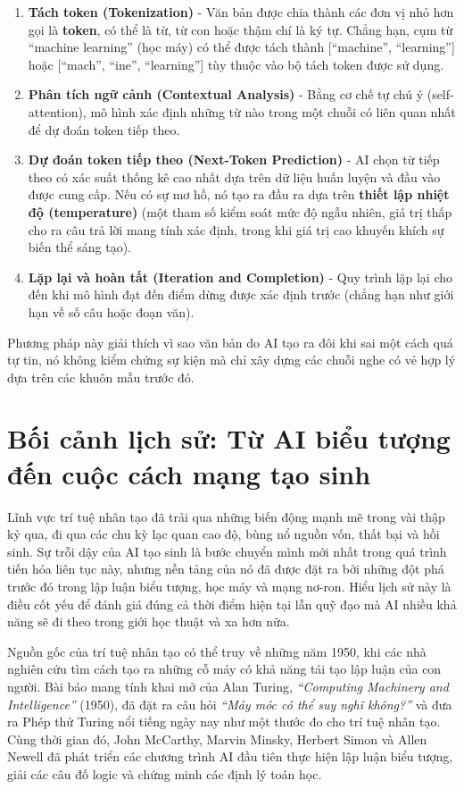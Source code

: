 \begin{enumerate}
\def\labelenumi{\arabic{enumi}.}
\item
  \textbf{Tách token (Tokenization)} - Văn bản được chia thành các đơn vị nhỏ hơn gọi là \textbf{token}, có thể là từ, từ con hoặc thậm chí là ký tự. Chẳng hạn, cụm từ ``machine learning'' (học máy) có thể được tách thành {[}``machine'', ``learning''{]} hoặc {[}``mach'', ``ine'', ``learning''{]} tùy thuộc vào bộ tách token được sử dụng.
\item
  \textbf{Phân tích ngữ cảnh (Contextual Analysis)} - Bằng cơ chế tự chú ý (self-attention), mô hình xác định những từ nào trong một chuỗi có liên quan nhất để dự đoán token tiếp theo.
\item
  \textbf{Dự đoán token tiếp theo (Next-Token Prediction)} - AI chọn từ tiếp theo có xác suất thống kê cao nhất dựa trên dữ liệu huấn luyện và đầu vào được cung cấp. Nếu có sự mơ hồ, nó tạo ra đầu ra dựa trên \textbf{thiết lập nhiệt độ (temperature)} (một tham số kiểm soát mức độ ngẫu nhiên, giá trị thấp cho ra câu trả lời mang tính xác định, trong khi giá trị cao khuyến khích sự biến thể sáng tạo).
\item
  \textbf{Lặp lại và hoàn tất (Iteration and Completion)} - Quy trình lặp lại cho đến khi mô hình đạt đến điểm dừng được xác định trước (chẳng hạn như giới hạn về số câu hoặc đoạn văn).
\end{enumerate}

Phương pháp này giải thích vì sao văn bản do AI tạo ra đôi khi sai một cách quá tự tin, nó không kiểm chứng sự kiện mà chỉ xây dựng các chuỗi nghe có vẻ hợp lý dựa trên các khuôn mẫu trước đó.

\section{Bối cảnh lịch sử: Từ AI biểu tượng đến cuộc cách mạng tạo sinh}

Lĩnh vực trí tuệ nhân tạo đã trải qua những biến động mạnh mẽ trong vài thập kỷ qua, đi qua các chu kỳ lạc quan cao độ, bùng nổ nguồn vốn, thất bại và hồi sinh. Sự trỗi dậy của AI tạo sinh là bước chuyển mình mới nhất trong quá trình tiến hóa liên tục này, nhưng nền tảng của nó đã được đặt ra bởi những đột phá trước đó trong lập luận biểu tượng, học máy và mạng nơ-ron. Hiểu lịch sử này là điều cốt yếu để đánh giá đúng cả thời điểm hiện tại lẫn quỹ đạo mà AI nhiều khả năng sẽ đi theo trong giới học thuật và xa hơn nữa.

Nguồn gốc của trí tuệ nhân tạo có thể truy về những năm 1950, khi các nhà nghiên cứu tìm cách tạo ra những cỗ máy có khả năng tái tạo lập luận của con người. Bài báo mang tính khai mở của Alan Turing, \emph{``Computing Machinery and Intelligence''} (1950), đã đặt ra câu hỏi \emph{``Máy móc có thể suy nghĩ không?''} và đưa ra Phép thử Turing nổi tiếng ngày nay như một thước đo cho trí tuệ nhân tạo. Cùng thời gian đó, John McCarthy, Marvin Minsky, Herbert Simon và Allen Newell đã phát triển các chương trình AI đầu tiên thực hiện lập luận biểu tượng, giải các câu đố logic và chứng minh các định lý toán học.

